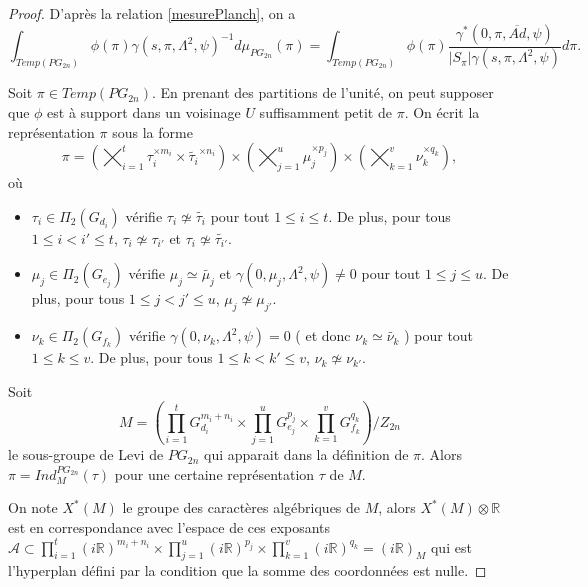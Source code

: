 \documentclass{amsart}
\begin{document}
\begin{proof}
D'après la relation \ref{mesurePlanch}, on a
\begin{equation}
\int_{Temp(PG_{2n})} \phi(\pi) \gamma(s, \pi, \Lambda^2, \psi)^{-1} d\mu_{PG_{2n}}(\pi) = 
\int_{Temp(PG_{2n})} \phi(\pi) \frac{\gamma^*(0, \pi, \overline{Ad}, \psi)}{|S_\pi|\gamma(s, \pi, \Lambda^2, \psi)} d\pi.
\end{equation}

Soit $\pi \in Temp(PG_{2n})$. En prenant des partitions de l'unité, on peut supposer que $\phi$ est à support dans un voisinage $U$ suffisamment petit de $\pi$. On écrit la représentation $\pi$ sous la forme
\begin{equation}
\pi = \left( \bigtimes_{i=1}^t \tau_i^{\times m_i} \times \widetilde{\tau_i}^{\times n_i} \right) \times \left( \bigtimes_{j=1}^u \mu_j^{\times p_j} \right) \times \left( \bigtimes_{k=1}^v \nu_k^{\times q_k}\right),
\end{equation}
où
\begin{itemize}
\item $\tau_i \in \Pi_2(G_{d_i})$ vérifie $\tau_i \not \simeq \widetilde{\tau_i}$ pour tout $1\leq i \leq t$. De plus, pour tous $1 \leq i < i' \leq t$, $\tau_i \not \simeq \tau_{i'}$ et $\tau_i \not \simeq \widetilde{\tau_{i'}}$.
\item $\mu_j \in \Pi_2(G_{e_j})$ vérifie $\mu_j \simeq \widetilde{\mu_j}$ et $\gamma(0, \mu_j, \Lambda^2, \psi) \neq 0$ pour tout $1\leq j \leq u$. De plus, pour tous $1 \leq j < j' \leq u$, $\mu_j \not \simeq \mu_{j'}$.
\item $\nu_k \in \Pi_2(G_{f_k})$ vérifie $\gamma(0, \nu_k, \Lambda^2, \psi) = 0$ ( et donc $\nu_k \simeq \widetilde{\nu_k}$ ) pour tout $1\leq k \leq v$. De plus, pour tous $1 \leq k < k' \leq v$, $\nu_k \not \simeq \nu_{k'}$.
\end{itemize}

Soit
\begin{equation}
M = \left( \prod_{i=1}^t G_{d_i}^{m_i+n_i} \times \prod_{j=1}^u G_{e_j}^{p_j} \times \prod_{k=1}^v G_{f_k}^{q_k} \right) / Z_{2n}
\end{equation}
le sous-groupe de Levi de $PG_{2n}$ qui apparait dans la définition de $\pi$. Alors $\pi = Ind_M^{PG_{2n}}(\tau)$ pour une certaine représentation $\tau$ de $M$.

On note $X^*(M)$ le groupe des caractères algébriques de $M$, alors $X^*(M) \otimes \mathbb{R}$ est en correspondance avec l'espace de ces exposants 
$\mathcal{A} \subset \prod_{i=1}^t (i\mathbb{R})^{m_i+n_i} \times \prod_{j=1}^u (i\mathbb{R})^{p_j} \times \prod_{k=1}^v (i\mathbb{R})^{q_k} = (i\mathbb{R})_M$ qui est l'hyperplan défini par la condition que la somme des coordonnées est nulle.


\end{proof}
\end{document}
